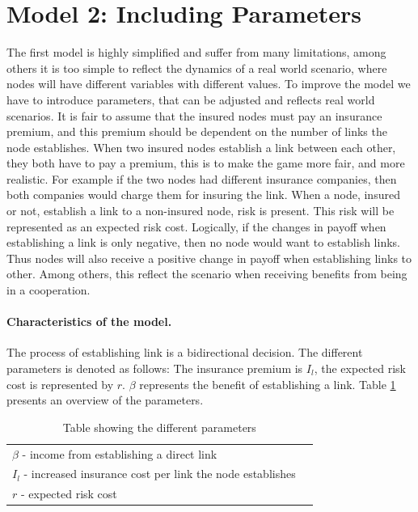 \section{Model 2: Including Parameters}
The first model is highly simplified and suffer from many limitations, among others it is too simple to reflect the dynamics of a real world scenario, where nodes will have different variables with different values. To improve the model we have to introduce parameters, that can be adjusted and reflects real world scenarios.
It is fair to assume that the insured nodes must pay an insurance premium, and this premium should be dependent on the number of links the node establishes. When two insured nodes establish a link between each other, they both have to pay a premium, this is to make the game more fair, and more realistic. For example if the two nodes had different insurance companies, then both companies would charge them for insuring the link.
When a node, insured or not, establish a link to a non-insured node, risk is present. This risk will be represented as an expected risk cost. Logically, if the changes in payoff when establishing a link is only negative, then no node would want to establish links. Thus nodes will also receive a positive change in payoff when establishing links to other. Among others, this reflect the scenario when receiving benefits from being in a cooperation. 

\paragraph{Characteristics of the model.}

The process of establishing link is a bidirectional decision. 
 The different parameters is denoted as follows: The insurance premium is $I_{l}$, the expected risk cost is represented by $r$. $\beta$ represents the benefit of establishing a link.  
Table \ref{tbl:simplegamepara} presents an overview of the parameters. 
\begin{table}[h]
\centering
\begin{tabular}{lc}
 \hline
  $\beta$ - income from establishing a direct link \\
  $I_{l}$ - increased insurance cost per link the node establishes\\
  $r$ - expected risk cost\\
  \hline
\end{tabular}
\caption{\label{tbl:simplegamepara} Table showing the different parameters}
\end{table}
